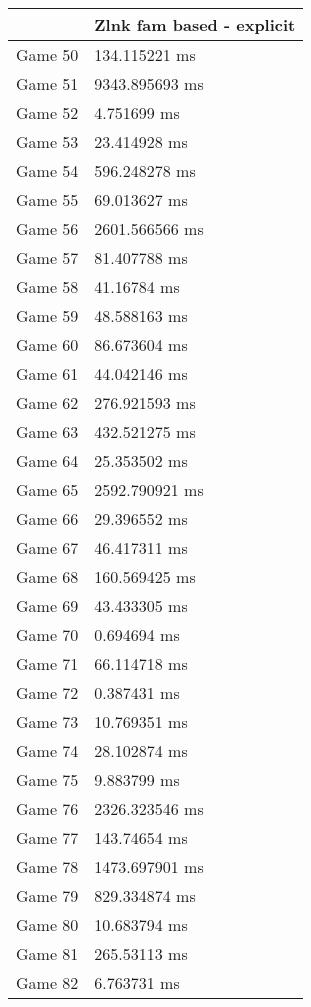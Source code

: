 \begin{tabular}{|l|l|}
	\hline
	& Zlnk fam based - explicit \\ \hline
	Game 50 & 134.115221 ms \\ \hline
	Game 51 & 9343.895693 ms \\ \hline
	Game 52 & 4.751699 ms \\ \hline
	Game 53 & 23.414928 ms \\ \hline
	Game 54 & 596.248278 ms \\ \hline
	Game 55 & 69.013627 ms \\ \hline
	Game 56 & 2601.566566 ms \\ \hline
	Game 57 & 81.407788 ms \\ \hline
	Game 58 & 41.16784 ms \\ \hline
	Game 59 & 48.588163 ms \\ \hline
	Game 60 & 86.673604 ms \\ \hline
	Game 61 & 44.042146 ms \\ \hline
	Game 62 & 276.921593 ms \\ \hline
	Game 63 & 432.521275 ms \\ \hline
	Game 64 & 25.353502 ms \\ \hline
	Game 65 & 2592.790921 ms \\ \hline
	Game 66 & 29.396552 ms \\ \hline
	Game 67 & 46.417311 ms \\ \hline
	Game 68 & 160.569425 ms \\ \hline
	Game 69 & 43.433305 ms \\ \hline
	Game 70 & 0.694694 ms \\ \hline
	Game 71 & 66.114718 ms \\ \hline
	Game 72 & 0.387431 ms \\ \hline
	Game 73 & 10.769351 ms \\ \hline
	Game 74 & 28.102874 ms \\ \hline
	Game 75 & 9.883799 ms \\ \hline
	Game 76 & 2326.323546 ms \\ \hline
	Game 77 & 143.74654 ms \\ \hline
	Game 78 & 1473.697901 ms \\ \hline
	Game 79 & 829.334874 ms \\ \hline
	Game 80 & 10.683794 ms \\ \hline
	Game 81 & 265.53113 ms \\ \hline
	Game 82 & 6.763731 ms \\ \hline

\end{tabular}
